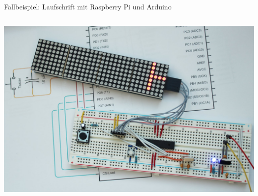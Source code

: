 \begin{frame}{Fallbeispiel: Laufschrift mit Raspberry Pi und Arduino}
\begin{columns}
        \includegraphics[width=\textwidth]{1-grundlagen/img/laufschrift_arduino2}
    \end{columns}
\end{frame}

